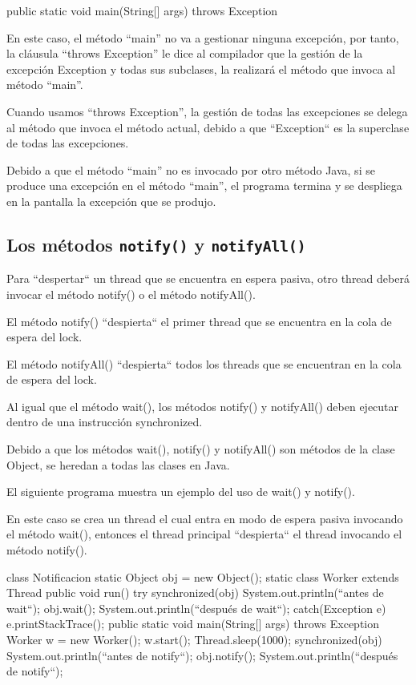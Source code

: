 \documentclass[11pt,a4paper,oneside]{book}
\begin{document}
\begin{SourceCode}
public static void main(String[] args) throws Exception
\end{SourceCode}

En este caso, el método “main” no va a gestionar ninguna excepción, por tanto, la cláusula “throws Exception” le dice al compilador que la gestión de la excepción Exception y todas sus subclases, la realizará el método que invoca al método “main”.

Cuando usamos “throws Exception”, la gestión de todas las excepciones se delega al método que invoca el método actual, debido a que ``Exception`` es la superclase de todas las excepciones.

Debido a que el método “main” no es invocado por otro método Java, si se produce una excepción en el método “main”, el programa termina y se despliega en la pantalla la excepción que se produjo.

\subsection{Los métodos \texttt{notify()} y \texttt{notifyAll()}}

Para ``despertar`` un thread que se encuentra en espera pasiva, otro thread deberá invocar el método notify() o el método notifyAll().

El método notify() ``despierta`` el primer thread que se encuentra en la cola de espera del lock.

El método notifyAll() ``despierta`` todos los threads que se encuentran en la cola de espera del lock.

Al igual que el método wait(), los métodos notify() y notifyAll() deben ejecutar dentro de una instrucción synchronized.

Debido a que los métodos wait(), notify() y notifyAll() son métodos de la clase Object, se heredan a todas las clases en Java.

El siguiente programa muestra un ejemplo del uso de wait() y notify().

En este caso se crea un thread el cual entra en modo de espera pasiva invocando el método wait(), entonces el thread principal ``despierta`` el thread invocando el método notify().

\begin{SourceCode}
class Notificacion
{
  static Object obj = new Object();
  static class Worker extends Thread
  {
    public void run()
    {
      try
      {
        synchronized(obj)
        {
          System.out.println(``antes de wait``);
          obj.wait();
          System.out.println(``después de wait``);
        }
      }
      catch(Exception e)
      {
        e.printStackTrace();
      }
    }
  }
  public static void main(String[] args) throws Exception
  {
    Worker w = new Worker();
    w.start();
    Thread.sleep(1000);
    synchronized(obj)
    {
      System.out.println(``antes de notify``);
      obj.notify();
      System.out.println(``después de notify``);
    }
  }
}
\end{SourceCode}
\end{document}
